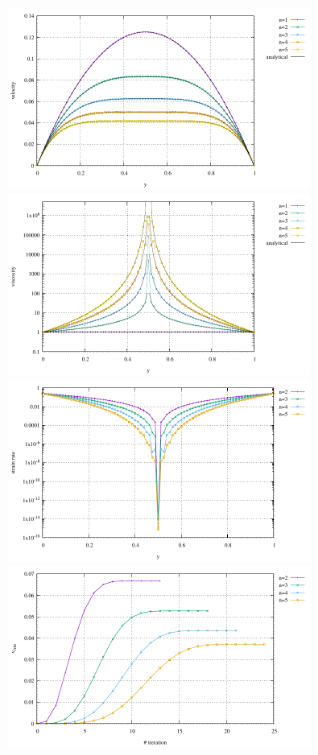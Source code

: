 \begin{center}
\includegraphics[width=8cm]{python_codes/fieldstone_87/results/experiment_08/meth3/vel_profile}
\includegraphics[width=8cm]{python_codes/fieldstone_87/results/experiment_08/meth3/eta_profile}\\
\includegraphics[width=8cm]{python_codes/fieldstone_87/results/experiment_08/meth3/sr_profile}
\includegraphics[width=8cm]{python_codes/fieldstone_87/results/experiment_08/meth3/vrms}
\end{center}


